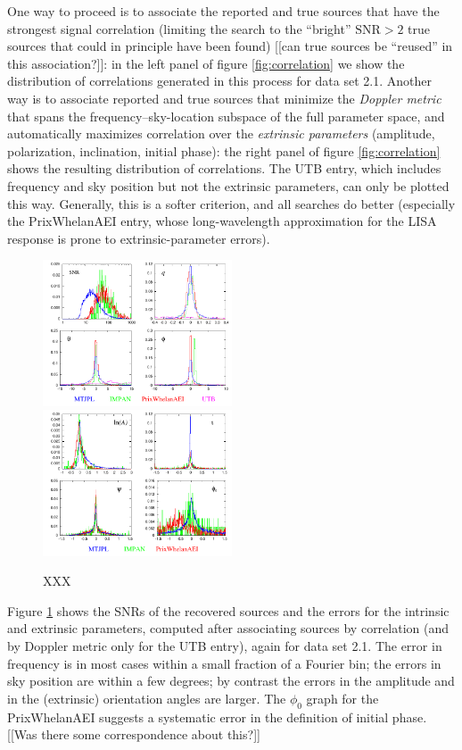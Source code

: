 \documentclass{iopart}
\begin{document}
One way to proceed is to associate the reported and true sources that have the strongest signal correlation (limiting the search to the ``bright'' $\mathrm{SNR} > 2$ true sources that could in principle have been found) [[can true sources be ``reused'' in this association?]]: in the left panel of figure \ref{fig:correlation} we show the distribution of correlations generated in this process for data set 2.1. Another way is to associate reported and true sources that minimize the \emph{Doppler metric} that spans the frequency--sky-location subspace of the full parameter space, and automatically maximizes correlation over the \emph{extrinsic parameters} (amplitude, polarization, inclination, initial phase): the right panel of figure \ref{fig:correlation} shows the resulting distribution of correlations. The UTB entry, which includes frequency and sky position but not the extrinsic parameters, can only be plotted this way. Generally, this is a softer criterion, and all searches do better (especially the PrixWhelanAEI entry, whose long-wavelength approximation for the LISA response is prone to extrinsic-parameter errors).
%
\begin{figure}
\includegraphics[width=0.5\textwidth]{intrinsic}
\includegraphics[width=0.5\textwidth]{extrinsic}
\caption{XXX\label{fig:paramerrors}}
\end{figure}

Figure \ref{fig:paramerrors} shows the SNRs of the recovered sources and the errors for the intrinsic and extrinsic parameters, computed after associating sources by correlation (and by Doppler metric only for the UTB entry), again for data set 2.1. The error in frequency is in most cases within a small fraction of a Fourier bin; the errors in sky position are within a few degrees; by contrast the errors in the amplitude and in the (extrinsic) orientation angles are larger. The $\phi_0$ graph for the PrixWhelanAEI suggests a systematic error in the definition of initial phase. [[Was there some correspondence about this?]]
\end{document}
